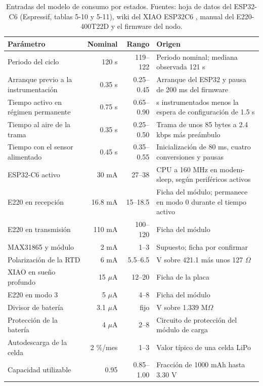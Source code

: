 \begin{table}[htbp]
\centering\small
\caption[Entradas del modelo de consumo por estados.]{Entradas del modelo de consumo por estados. Fuentes: hoja de datos del ESP32-C6 (Espressif, tablas 5-10 y 5-11), wiki del XIAO ESP32C6 \citep{xiaoc6}, manual del E220-400T22D \citep{e220manual} y el firmware del nodo.}
\label{tab:resultados-modelo-entradas}
\begin{tabularx}{\textwidth}{@{}>{\raggedright\arraybackslash}p{3.6cm}rr>{\raggedright\arraybackslash}X@{}}
\toprule
\textbf{Parámetro} & \textbf{Nominal} & \textbf{Rango} & \textbf{Origen} \\
\midrule
Periodo del ciclo & 120 s & 119--122 & Periodo nominal; mediana observada 121 s \\
Arranque previo a la instrumentación & 0.35 s & 0.25--0.45 & Arranque del ESP32 y pausa de 200 ms del firmware \\
Tiempo activo en régimen permanente & 0.75 s & 0.65--0.90 & 2.279 s instrumentados menos la espera de configuración de 1.5 s \\
Tiempo al aire de la trama & 0.35 s & 0.25--0.50 & Trama de unos 85 bytes a 2.4 kbps más preámbulo \\
Tiempo con el sensor alimentado & 0.45 s & 0.35--0.55 & Inicialización de 80 ms, cuatro conversiones y pausas \\
ESP32-C6 activo & 30 mA & 27--38 & CPU a 160 MHz en modem-sleep, según periféricos activos \\
E220 en recepción & 16.8 mA & 15--18.5 & Ficha del módulo; permanece en modo 0 durante el tiempo activo \\
E220 en transmisión & 110 mA & 100--120 & Ficha del módulo \\
MAX31865 y módulo & 2 mA & 1--3 & Supuesto; ficha por confirmar \\
Polarización de la RTD & 6 mA & 5.5--6.5 & 3.3 V sobre 421.1 más unos 127 $\Omega$ \\
XIAO en sueño profundo & 15 $\mu$A & 12--20 & Ficha de la placa \\
E220 en modo 3 & 5 $\mu$A & 4--8 & Ficha del módulo \\
Divisor de batería & 3.1 $\mu$A & fijo & 4.2 V sobre 1.339 M$\Omega$ \\
Protección de la batería & 4 $\mu$A & 2--8 & Circuito de protección del módulo de carga \\
Autodescarga de la celda & 2 \%/mes & 1--3 & Valor típico de una celda LiPo \\
Capacidad utilizable & 0.95 & 0.85--1.00 & Fracción de 1000 mAh hasta 3.30 V \\
\bottomrule
\end{tabularx}
\end{table}

